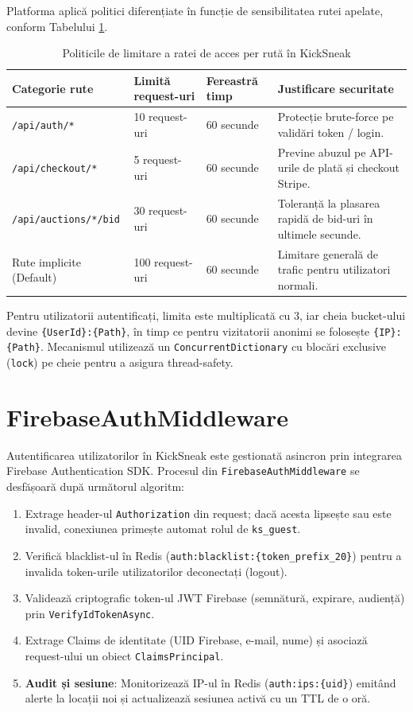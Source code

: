 Platforma aplică politici diferențiate în funcție de sensibilitatea rutei apelate, conform Tabelului \ref{tab:ratelimit}.

\begin{table}[htbp]
\centering
\small
\begin{tabular}{p{4cm} p{2.5cm} p{2.5cm} p{6cm}}
\toprule
\textbf{Categorie rute} & \textbf{Limită request-uri} & \textbf{Fereastră timp} & \textbf{Justificare securitate} \\
\midrule
\texttt{/api/auth/*} & 10 request-uri & 60 secunde & Protecție brute-force pe validări token / login. \\
\texttt{/api/checkout/*} & 5 request-uri & 60 secunde & Previne abuzul pe API-urile de plată și checkout Stripe. \\
\texttt{/api/auctions/*/bid} & 30 request-uri & 60 secunde & Toleranță la plasarea rapidă de bid-uri în ultimele secunde. \\
Rute implicite (Default) & 100 request-uri & 60 secunde & Limitare generală de trafic pentru utilizatori normali. \\
\bottomrule
\end{tabular}
\caption{Politicile de limitare a ratei de acces per rută în KickSneak}
\label{tab:ratelimit}
\end{table}

Pentru utilizatorii autentificați, limita este multiplicată cu 3, iar cheia bucket-ului devine \texttt{\{UserId\}:\{Path\}}, în timp ce pentru vizitatorii anonimi se folosește \texttt{\{IP\}:\{Path\}}. Mecanismul utilizează un \texttt{ConcurrentDictionary} cu blocări exclusive (\texttt{lock}) pe cheie pentru a asigura thread-safety.

\section{FirebaseAuthMiddleware}

Autentificarea utilizatorilor în KickSneak este gestionată asincron prin integrarea Firebase Authentication SDK. Procesul din \texttt{FirebaseAuthMiddleware} se desfășoară după următorul algoritm:
\begin{enumerate}
    \item Extrage header-ul \texttt{Authorization} din request; dacă acesta lipsește sau este invalid, conexiunea primește automat rolul de \texttt{ks\_guest}.
    \item Verifică blacklist-ul în Redis (\texttt{auth:blacklist:\{token\_prefix\_20\}}) pentru a invalida token-urile utilizatorilor deconectați (logout).
    \item Validează criptografic token-ul JWT Firebase (semnătură, expirare, audiență) prin \texttt{VerifyIdTokenAsync}.
    \item Extrage Claims de identitate (UID Firebase, e-mail, nume) și asociază request-ului un obiect \texttt{ClaimsPrincipal}.
    \item \textbf{Audit și sesiune}: Monitorizează IP-ul în Redis (\texttt{auth:ips:\{uid\}}) emitând alerte la locații noi și actualizează sesiunea activă cu un TTL de o oră.
\end{enumerate}

